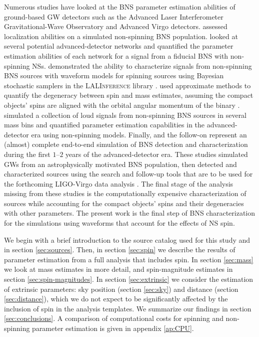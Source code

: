 Numerous studies have looked at the BNS parameter estimation abilities of ground-based GW detectors such as the Advanced Laser Interferometer Gravitational-Wave Observatory \citep[aLIGO;][]{Aasi_2015} and Advanced Virgo \citep[AdV;][]{Acernese_2014} detectors. \citet{Nissanke_2010,Nissanke_2011} assessed localization abilities on a simulated non-spinning BNS population. \citet{Veitch_2012} looked at several potential advanced-detector networks and quantified the parameter estimation abilities of each network for a signal from a fiducial BNS with non-spinning NSs. \citet{Aasi_2013} demonstrated the ability to characterize signals from non-spinning BNS sources with waveform models for spinning sources using Bayesian stochastic samplers in the \textsc{LALInference} library \citep{Veitch_2014}.  \citet{Hannam_2013} used approximate methods to quantify the degeneracy between spin and mass estimates, assuming the compact objects' spins are aligned with the orbital angular momentum of the binary \citep[but see][]{Haster_2015}. \citet{Rodriguez_2014} simulated a collection of loud signals from non-spinning BNS sources in several mass bins and quantified parameter estimation capabilities in the advanced-detector era using non-spinning models.  Finally, \citet{Singer_2014} and the follow-on \citet{Berry_2014} represent an (almost) complete end-to-end simulation of BNS detection and characterization during the first $1$--$2$ years of the advanced-detector era. These studies simulated GWs from an astrophysically motivated BNS population, then detected and characterized sources using the search and follow-up tools that are to be used for the forthcoming LIGO-Virgo data analysis \citep{WhitePaper}.   The final stage of the analysis missing from these studies is the computationally expensive characterization of sources while accounting for the compact objects' spins and their degeneracies with other parameters.  The present work is the final step of BNS characterization for the \citet{Singer_2014} simulations using waveforms that account for the effects of NS spin.

We begin with a brief introduction to the source catalog used for this study and \citet{Singer_2014} in section \ref{sec:sources}. Then, in section \ref{sec:spin} we describe the results of parameter estimation from a full analysis that includes spin. In section \ref{sec:mass} we look at mass estimates in more detail, and spin-magnitude estimates in section \ref{sec:spin-magnitudes}. In section \ref{sec:extrinsic} we consider the estimation of extrinsic parameters: sky position (section \ref{sec:sky}) and distance (section \ref{sec:distance}), which we do not expect to be significantly affected by the inclusion of spin in the analysis templates. We summarize our findings in section \ref{sec:conclusions}. A comparison of computational costs for spinning and non-spinning parameter estimation is given in appendix \ref{ap:CPU}.

  
  
  
  
  
  
  
  
  
  
  
  
  